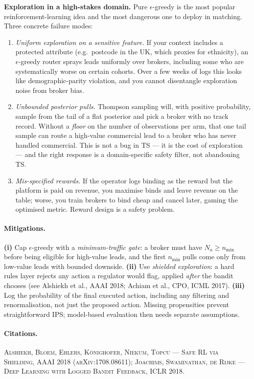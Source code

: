 \documentclass[11pt,oneside]{scrbook}
\begin{document}
\begin{safetyangle}
\textbf{Exploration in a high-stakes domain.}
Pure $\epsilon$-greedy is the most popular reinforcement-learning idea and the
most dangerous one to deploy in matching. Three concrete failure modes:

\begin{enumerate}\setlength\itemsep{2pt}
  \item \emph{Uniform exploration on a sensitive feature.} If your context
        includes a protected attribute (e.g.\ postcode in the UK, which proxies
        for ethnicity), an $\epsilon$-greedy router sprays leads uniformly over
        brokers, including some who are systematically worse on certain
        cohorts. Over a few weeks of logs this looks like demographic-parity
        violation, and you cannot disentangle exploration noise from broker
        bias.
  \item \emph{Unbounded posterior pulls.} Thompson sampling will, with positive
        probability, sample from the tail of a flat posterior and pick a broker
        with no track record. Without a \emph{floor} on the number of
        observations per arm, that one tail sample can route a high-value
        commercial lead to a broker who has never handled commercial. This is
        not a bug in TS --- it is the cost of exploration --- and the right
        response is a domain-specific safety filter, not abandoning TS.
  \item \emph{Mis-specified rewards.} If the operator logs binding as the
        reward but the platform is paid on revenue, you maximise binds and
        leave revenue on the table; worse, you train brokers to bind cheap and
        cancel later, gaming the optimised metric. Reward design is a safety
        problem.
\end{enumerate}

\paragraph{Mitigations.} \textbf{(i)} Cap $\epsilon$-greedy with a
\emph{minimum-traffic gate}: a broker must have $N_a\ge n_{\min}$ before being
eligible for high-value leads, and the first $n_{\min}$ pulls come only from
low-value leads with bounded downside. \textbf{(ii)} Use \emph{shielded
exploration}: a hard rules layer rejects any action a regulator would flag,
applied \emph{after} the bandit chooses (see Alshiekh et al., AAAI
2018; Achiam et al., CPO, ICML 2017). \textbf{(iii)} Log
the probability of the final executed action, including any filtering and
renormalisation, not just the proposed action. Missing propensities prevent
straightforward IPS; model-based evaluation then needs separate assumptions.

\paragraph{Citations.}
\textsc{Alshiekh, Bloem, Ehlers, K\"onighofer, Niekum, Topcu --- Safe RL via
Shielding, AAAI 2018 (arXiv:1708.08611)};
\textsc{Joachims, Swaminathan, de Rijke --- Deep Learning with Logged Bandit
Feedback, ICLR 2018}.
\end{safetyangle}
\end{document}
